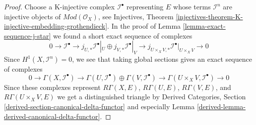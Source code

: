 \documentclass[10pt,a4paper]{amsart}
\theoremstyle{plain}
\theoremstyle{definition}
\theoremstyle{remark}
\numberwithin{equation}{subsection}
\begin{document}
\begin{proof}
Choose a K-injective complex $\mathcal{I}^\bullet$ representing $E$
whose terms $\mathcal{I}^n$ are injective objects of
$\textit{Mod}(\mathcal{O}_X)$, see Injectives, Theorem
\ref{injectives-theorem-K-injective-embedding-grothendieck}.
In the proof of Lemma \ref{lemma-exact-sequence-j-star}
we found a short exact sequence
of complexes
$$
0 \to \mathcal{I}^\bullet \to
j_{U, *}\mathcal{I}^\bullet|_U \oplus j_{V, *}\mathcal{I}^\bullet|_V \to
j_{U \times_X V, *}\mathcal{I}^\bullet|_{U \times_X V} \to 0
$$
Since $H^1(X, \mathcal{I}^n) = 0$, we see that
taking global sections gives an exact sequence of complexes
$$
0 \to \Gamma(X, \mathcal{I}^\bullet) \to
\Gamma(U, \mathcal{I}^\bullet) \oplus
\Gamma(V, \mathcal{I}^\bullet) \to
\Gamma(U \times_X V, \mathcal{I}^\bullet) \to 0
$$
Since these complexes represent
$R\Gamma(X, E)$, $R\Gamma(U, E)$, $R\Gamma(V, E)$, and
$R\Gamma(U \times_X V, E)$ we 
get a distinguished triangle by
Derived Categories, Section
\ref{derived-section-canonical-delta-functor} and especially
Lemma \ref{derived-lemma-derived-canonical-delta-functor}.
\end{proof}
\end{document}
